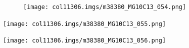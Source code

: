 \begin{table}[H]
\begin{enumerate}[noitemsep,
label=\textbf{\arabic*}. ]
\begin{figure}[H]
\begin{center}
\label{m38380*id320164!!!underscore!!!media}\label{
m38380*id320164!!!underscore!!!printimage}\texttt{[image: 
col11306.imgs/m38380\_MG10C13\_054.png]} %
        
    
    \end{center}

 \end{figure}   

    \addtocounter{footnote}{-0}
    
          


\label{m38380*id320183!!!underscore!!!media}\label{
m38380*id320183!!!underscore!!!printimage}\texttt{[image: 
col11306.imgs/m38380\_MG10C13\_055.png]} %
        
    


    
          


%   
\label{m38380*id320201!!!underscore!!!media}\label{
m38380*id320201!!!underscore!!!printimage}\texttt{[image: 
col11306.imgs/m38380\_MG10C13\_056.png]} %
        
    



\end{enumerate}
\end{table}
